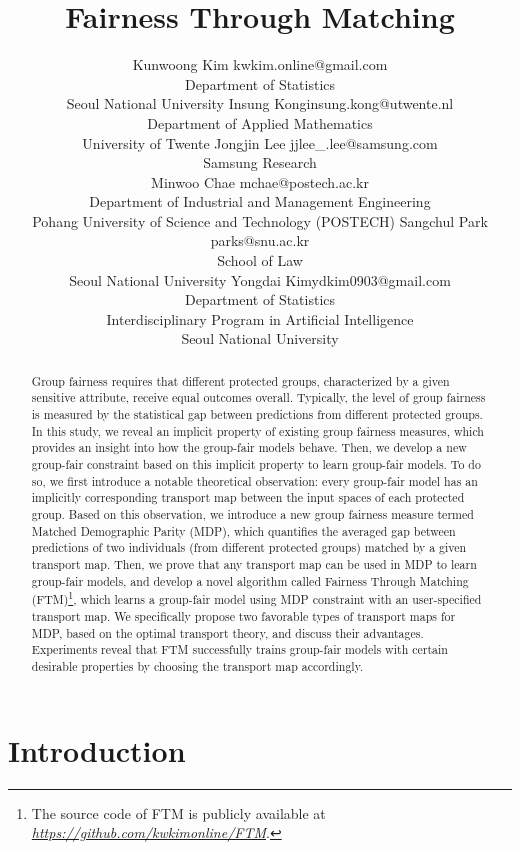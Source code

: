 \documentclass[10pt]{article} %
\title{Fairness Through Matching}
\author{\name Kunwoong Kim \email kwkim.online@gmail.com \\
\addr Department of Statistics\\ Seoul National University
\AND
\name Insung Kong\footnotemark[1] \email insung.kong@utwente.nl \\
\addr Department of Applied Mathematics\\ University of Twente
\AND
\name Jongjin Lee \email jjlee\_.lee@samsung.com \\
\addr Samsung Research\\ 
\AND
\name Minwoo Chae \email mchae@postech.ac.kr \\
\addr Department of Industrial and Management Engineering\\ Pohang University of Science and Technology (POSTECH)
\AND
\name Sangchul Park \email parks@snu.ac.kr \\
\addr School of Law\\ Seoul National University
\AND
\name Yongdai Kim\footnotemark[2] \email ydkim0903@gmail.com \\
\addr Department of Statistics\\ Interdisciplinary Program in Artificial Intelligence\\ Seoul National University
    }
\renewcommand{\thefootnote}{\fnsymbol{footnote}}
\begin{document}
\maketitle

\begin{abstract}
    Group fairness requires that different protected groups, characterized by a given sensitive attribute, receive equal outcomes overall.
    Typically, the level of group fairness is measured by the statistical gap between predictions from different protected groups.
    In this study, we reveal an implicit property of existing group fairness measures, which provides an insight into how the group-fair models behave.
    Then, we develop a new group-fair constraint based on this implicit property to learn group-fair models.
    To do so, we first introduce a notable theoretical observation: every group-fair model has an implicitly corresponding transport map between the input spaces of each protected group.
    Based on this observation, we introduce a new group fairness measure termed Matched Demographic Parity (MDP), which quantifies the averaged gap between predictions of two individuals (from different protected groups) matched by a given transport map.
    Then, we prove that any transport map can be used in MDP to learn group-fair models, and develop a novel algorithm called Fairness Through Matching (FTM)\footnote{The source code of FTM is publicly available at \textit{\url{https://github.com/kwkimonline/FTM}}.}, which learns a group-fair model using MDP constraint with an user-specified transport map.
    We specifically propose two favorable types of transport maps for MDP, based on the optimal transport theory, and discuss their advantages.
    Experiments reveal that FTM successfully trains group-fair models with certain desirable properties by choosing the transport map accordingly.
\end{abstract}

\begingroup
    \renewcommand{\thefootnote}{\fnsymbol{footnote}}
\endgroup


\section{Introduction}\label{sec:intro}
\end{document}
